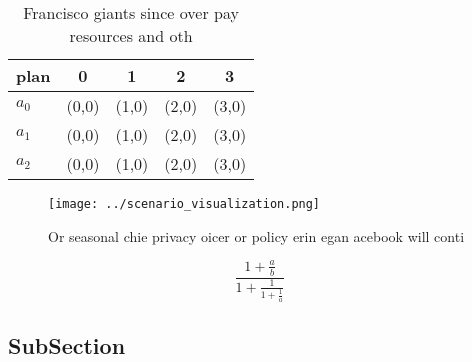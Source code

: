 \documentclass[a4paper]{article}
\begin{document}
\begin{table}
\begin{adjustbox}{width=0.6\columnwidth}
\begin{tabular}{|l|l|l|l|l|}
\hline
\textbf{plan} & \multicolumn{1}{c|}{\textbf{0}} & \multicolumn{1}{c|}{\textbf{1}} & \multicolumn{1}{c|}{\textbf{2}} & \multicolumn{1}{c|}{\textbf{3}} \\ \hline
\textbf{$a_0$}  & (0,0) & (1,0) & (2,0) & (3,0) \\ \hline
\textbf{$a_1$}  & (0,0) & (1,0) & (2,0) & (3,0) \\ \hline
\textbf{$a_2$}  & (0,0) & (1,0) & (2,0) & (3,0) \\ \hline
\end{tabular}
\end{adjustbox}
\caption{Francisco giants since over pay resources and oth
}
\end{table}

\begin{figure}
\centering
\texttt{[image: ../scenario\_visualization.png]}
\caption{Or seasonal chie privacy oicer or policy erin egan acebook will conti
}
\end{figure}
 
\[ \frac{1+\frac{a}{b}}{1+\frac{1}{1+\frac{1}{a}}} \]

\subsection{SubSection}
\end{document}

